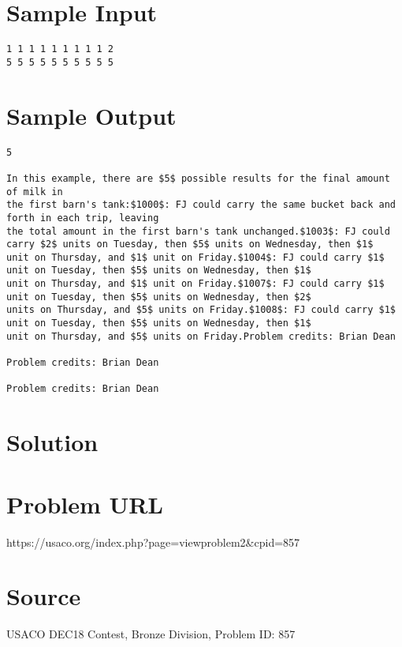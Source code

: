 \documentclass[12pt]{article}
\begin{document}
\section*{Sample Input}
\begin{verbatim}
1 1 1 1 1 1 1 1 1 2
5 5 5 5 5 5 5 5 5 5
\end{verbatim}

\section*{Sample Output}
\begin{verbatim}
5

In this example, there are $5$ possible results for the final amount of milk in
the first barn's tank:$1000$: FJ could carry the same bucket back and forth in each trip, leaving
the total amount in the first barn's tank unchanged.$1003$: FJ could carry $2$ units on Tuesday, then $5$ units on Wednesday, then $1$
unit on Thursday, and $1$ unit on Friday.$1004$: FJ could carry $1$ unit on Tuesday, then $5$ units on Wednesday, then $1$
unit on Thursday, and $1$ unit on Friday.$1007$: FJ could carry $1$ unit on Tuesday, then $5$ units on Wednesday, then $2$
units on Thursday, and $5$ units on Friday.$1008$: FJ could carry $1$ unit on Tuesday, then $5$ units on Wednesday, then $1$
unit on Thursday, and $5$ units on Friday.Problem credits: Brian Dean

Problem credits: Brian Dean

Problem credits: Brian Dean
\end{verbatim}

\section*{Solution}


\section*{Problem URL}
https://usaco.org/index.php?page=viewproblem2&cpid=857

\section*{Source}
USACO DEC18 Contest, Bronze Division, Problem ID: 857
\end{document}

